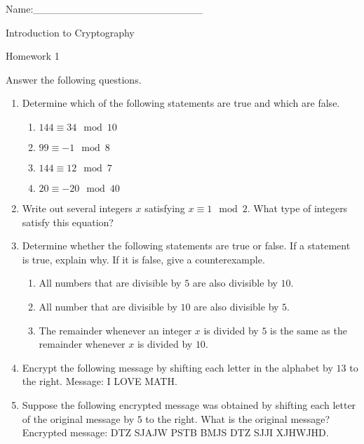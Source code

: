 \documentclass[12pt]{amsart}
\theoremstyle{definition}
\theoremstyle{remark}
\numberwithin{equation}{section}
\begin{document}
\begin{flushright}
Name:\_\_\_\_\_\_\_\_\_\_\_\_\_\_\_\_\_\_\_\_\_\_\_
\end{flushright}
\vspace{10pt}
\begin{center}
Introduction to Cryptography

Homework 1
\end{center}

Answer the following questions.

\begin{enumerate}
\item Determine which of the following statements are true and which are false.
\begin{enumerate}
\item $144\equiv34\mod 10$
\item $99\equiv -1 \mod 8$
\item $144\equiv 12\mod 7$
\item $20\equiv -20\mod 40$
\end{enumerate}
\vspace{10pt}
\item Write out several integers $x$ satisfying $x\equiv 1\mod 2$. What type of integers satisfy this equation?
\vspace{10pt}
\item Determine whether the following statements are true or false. If a statement is true, explain why. If it is false, give a counterexample.
\begin{enumerate}
\item All numbers that are divisible by $5$ are also divisible by $10$.
\item All number that are divisible by $10$ are also divisible by $5$.
\item The remainder whenever an integer $x$ is divided by $5$ is the same as the remainder whenever $x$ is divided by $10$.
\end{enumerate}
\vspace{10pt}
\item Encrypt the following message by shifting each letter in the alphabet by $13$ to the right. Message: I LOVE MATH.
\vspace{10pt}
\item Suppose the following encrypted message was obtained by shifting each letter of the original message by $5$ to the right. What is the original message? Encrypted message: DTZ SJAJW PSTB BMJS DTZ SJJI XJHWJHD.
\end{enumerate}
\vfill
\end{document}
